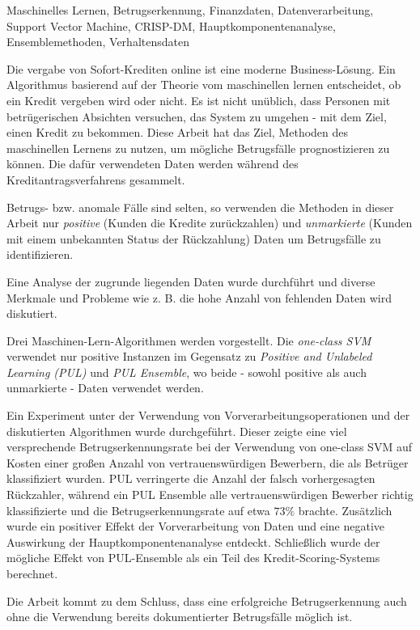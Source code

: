 \documentclass[draft=false
              ,paper=a4
              ,twoside=false
              ,fontsize=11pt
              ,headsepline
              ,BCOR10mm
              ,DIV11
              ]{scrbook}
\begin{document}
\HAWAbstractPage
{
    Maschinelles Lernen, 
    Betrugserkennung, 
    Finanzdaten, 
    Datenverarbeitung, 
    Support Vector Machine, 
    CRISP-DM, 
    Hauptkomponentenanalyse, 
    Ensemblemethoden, 
    Verhaltensdaten
}
{ 
 Die vergabe von Sofort-Krediten online ist eine moderne Business-Lösung. Ein Algorithmus basierend auf der Theorie vom maschinellen lernen entscheidet, ob ein Kredit vergeben wird oder nicht. Es ist nicht unüblich, dass Personen mit betrügerischen Absichten versuchen, das System zu umgehen - mit dem Ziel, einen Kredit zu bekommen. Diese Arbeit hat das Ziel, Methoden des maschinellen Lernens zu nutzen, um mögliche Betrugsfälle prognostizieren zu können. Die dafür verwendeten Daten werden während des Kreditantragsverfahrens gesammelt. 

Betrugs- bzw. anomale Fälle sind selten, so verwenden die Methoden in dieser Arbeit nur \textit{positive} (Kunden die Kredite zurückzahlen) und \textit{unmarkierte} (Kunden mit einem unbekannten Status der Rückzahlung) Daten um Betrugsfälle zu identifizieren. 

Eine Analyse der zugrunde liegenden Daten wurde durchführt und diverse Merkmale und Probleme wie z. B. die hohe Anzahl von fehlenden Daten wird diskutiert.

Drei Maschinen-Lern-Algorithmen werden vorgestellt. Die \textit{one-class SVM} verwendet nur positive Instanzen im Gegensatz zu \textit{Positive and Unlabeled Learning (PUL)} und \textit{PUL Ensemble}, wo beide - sowohl positive als auch unmarkierte - Daten verwendet werden.

Ein Experiment unter der Verwendung von Vorverarbeitungsoperationen und der diskutierten Algorithmen wurde durchgeführt. Dieser zeigte eine viel versprechende Betrugserkennungsrate bei der Verwendung von one-class SVM auf Kosten einer großen Anzahl von vertrauenswürdigen Bewerbern, die als Betrüger klassifiziert wurden. PUL verringerte die Anzahl der falsch vorhergesagten Rückzahler, während ein PUL Ensemble alle vertrauenswürdigen Bewerber richtig klassifizierte und die Betrugserkennungsrate auf etwa \(73 \% \) brachte. Zusätzlich wurde ein positiver Effekt der Vorverarbeitung von Daten und eine negative Auswirkung der Hauptkomponentenanalyse entdeckt. Schließlich wurde der mögliche Effekt von PUL-Ensemble als ein Teil des Kredit-Scoring-Systems berechnet.

Die Arbeit kommt zu dem Schluss, dass eine erfolgreiche Betrugserkennung auch ohne die Verwendung bereits dokumentierter Betrugsfälle möglich ist.
}
\end{document}
